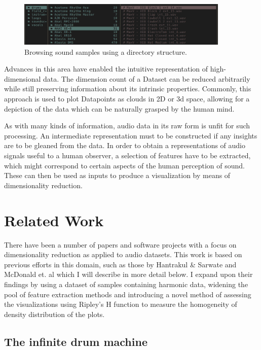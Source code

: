 \documentclass[a4paper, 12pt, twoside]{report}
\begin{document}
\begin{figure}[h]
\centering
\includegraphics[width=0.9\textwidth]{./Figures/ontologyFE.png}
\caption{Browsing sound samples using a directory structure.}
\end{figure}


Advances in this area have enabled the intuitive representation of high-dimensional data. The dimension count of a Dataset can be reduced arbitrarily while still preserving information about its intrinsic properties. Commonly, this approach is used to plot Datapoints as clouds in 2D or 3d space, allowing for a depiction of the data which can be naturally grasped by the human mind.

As with many kinds of information, audio data in its raw form is unfit for such processing. An intermediate representation must to be constructed if any insights are to be gleaned from the data. In order to obtain a representations of audio signals useful to a human observer, a selection of features have to be extracted, which might correspond to certain aspects of the human perception of sound. These can then be used as inputs to produce a visualization by means of dimensionality reduction.


\section{Related Work}
\label{sec:org42eee01}

There have been a number of papers and software projects with a focus on dimensionality reduction as applied to audio datasets. This work is based on previous efforts in this domain, such as those by Hantrakul \& Sarwate \cite{klustr} and McDonald et. al \cite{inf_drum_machine} which I will describe in more detail below. I expand upon their findings by using a dataset of samples containing harmonic data, widening the pool of feature extraction methods and introducing a novel method of assessing the visualizations using Ripley's H function to measure the homogeneity of density distribution of the plots.

\subsection{The infinite drum machine}
\label{sec:org4401227}
\end{document}
